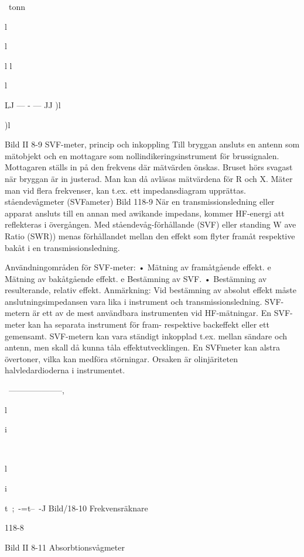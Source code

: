 ~tonn

l

l

l
l

l

LJ --- - --- JJ
)l

)l

Bild II 8-9 SVF-meter, princip och inkoppling
Till bryggan ansluts en antenn som mätobjekt och en mottagare som nollindikeringsinstrument för brussignalen. Mottagaren
ställs in på den frekvens där mätvärden
önskas. Bruset hörs svagast när bryggan är
in justerad. Man kan då avläsas mätvärdena
för R och X. Mäter man vid flera frekvenser,
kan t.ex. ett impedansdiagram upprättas.
ståendevågmeter (SVFameter)
Bild 118-9
När en transmissionsledning eller apparat
ansluts till en annan med awikande impedans, kommer HF-energi att reflekteras i
övergången.
Med ståendevåg-förhållande (SVF) eller
standing W ave Ratio (SWR)) menas förhållandet mellan den effekt som flyter framåt
respektive bakåt i en transmissionsledning.

Användningområden för SVF-meter:
• Mätning av framåtgående effekt.
e Mätning av bakåtgående effekt.
e Bestämning av SVF.
• Bestämning av resulterande, relativ effekt.
Anmärkning: Vid bestämning av absolut
effekt måste anslutningsimpedansen vara
lika i instrument och transmissionsledning.
SVF-metern är ett av de mest användbara instrumenten vid HF-mätningar. En
SVF-meter kan ha separata instrument för
fram- respektive backeffekt eller ett gemensamt.
SVF-metern kan vara ständigt inkopplad
t.ex. mellan sändare och antenn, men skall
då kunna tåla effektutvecklingen. En SVFmeter kan alstra övertoner, vilka kan medföra störningar. Orsaken är olinjäriteten
halvledardioderna i instrumentet.

~--------------------,

l

i

~

l

i

t~;~-=t--~-J
Bild/18-10 Frekvensräknare

118-8

Bild II 8-11 Absorbtionsvågmeter

